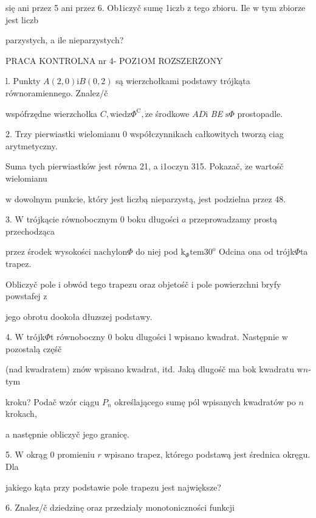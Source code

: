 \documentclass[a4paper,12pt]{article}
\begin{document}
się ani przez 5 ani przez 6. Ob1iczyč sumę 1iczb $\mathrm{z}$ tego zbioru. Ile $\mathrm{w}$ tym zbiorze jest liczb

parzystych, a ile nieparzystych?




PRACA KONTROLNA nr 4- POZ1OM ROZSZERZONY

l. Punkty $A(2,0)\mathrm{i}B(0,2)$ są wierzchołkami podstawy trójkąta równoramiennego. Znalez/č

wspófrzędne wierzchołka $C, \mathrm{w}\mathrm{i}\mathrm{e}\mathrm{d}\mathrm{z}\Phi^{\mathrm{C}}, \dot{\mathrm{z}}\mathrm{e}$ środkowe $AD\mathrm{i}$ {\it BE} $\mathrm{s}\Phi$ prostopadle.

2. Trzy pierwiastki wielomianu $0$ współczynnikach całkowitych tworzą ciag arytmetyczny.

Suma tych pierwiastków jest równa 21, a i1oczyn 315. Pokazač, $\dot{\mathrm{z}}\mathrm{e}$ wartośč wielomianu

$\mathrm{w}$ dowolnym punkcie, który jest liczbą nieparzystą, jest podzielna przez 48.

3. $\mathrm{W}$ trójkącie równobocznym $0$ boku długości $a$ przeprowadzamy prostą przechodząca

przez środek wysokości $\mathrm{n}\mathrm{a}\mathrm{c}\mathrm{h}\mathrm{y}\mathrm{l}\mathrm{o}\mathrm{n}\Phi$ do niej pod $\mathrm{k}_{\Phi}\mathrm{t}\mathrm{e}\mathrm{m}30^{\mathrm{o}}$ Odcina ona od trójk$\Phi$ta trapez.

Obliczyč pole $\mathrm{i}$ obwód tego trapezu oraz objetośč $\mathrm{i}$ pole powierzchni bryfy powstafej $\mathrm{z}$

jego obrotu dookoła dłuzszej podstawy.

4. $\mathrm{W}$ trójk$\Phi$t równoboczny $0$ boku dlugości l wpisano kwadrat. Następnie $\mathrm{w}$ pozostalą częśč

(nad kwadratem) znów wpisano kwadrat, itd. Jaką dlugośč ma bok kwadratu $\mathrm{w}n$-tym

kroku? Podač wzór ciągu $P_{n}$ określającego sumę pól wpisanych kwadratów po $n$ krokach,

a następnie obliczyč jego granicę.

5. $\mathrm{W}$ okrąg $0$ promieniu $r$ wpisano trapez, którego podstawą jest średnica okręgu. Dla

jakiego kąta przy podstawie pole trapezu jest największe?

6. Znalez/č dziedzinę oraz przedzialy monotoniczności funkcji
\end{document}
